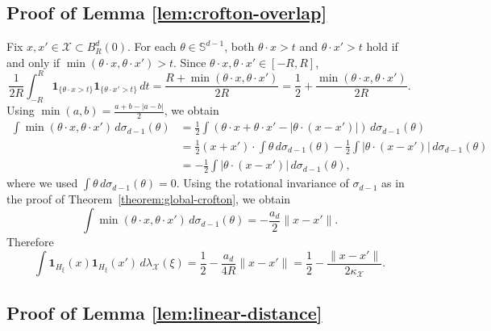 \documentclass[11pt]{amsart}
\theoremstyle{definition}
\theoremstyle{remark}
\newcommand{\1}{\mathbf{1}}
\newcommand{\Sd}{\mathbb{S}}
\numberwithin{equation}{section}
\begin{document}
\subsection{Proof of Lemma \ref{lem:crofton-overlap}}
\label{pf:crofton-overlap}
Fix $x,x'\in \mathcal{X} \subset B^d_R(0)$. For each $\theta \in \Sd^{d-1}$,
both $\theta\cdot x > t$ and $\theta\cdot x'> t$ hold if and only if
$\min(\theta\cdot x, \theta\cdot x') > t$. Since
$\theta\cdot x, \theta\cdot x' \in [-R,R]$,
\[
    \frac{1}{2R}\int_{-R}^R
    \mathbf 1_{\{\theta\cdot x>t\}}
    \mathbf 1_{\{\theta\cdot x'>t\}}
    \, dt
    = \frac{R+\min(\theta\cdot x,\theta\cdot x')}{2R}
    = \frac{1}{2} + \frac{\min(\theta\cdot x,\theta\cdot x')}{2R}.
\]
Using $\min(a,b)=\frac{a+b-|a-b|}{2}$, we obtain
\begin{align*}
\int
    \min(\theta\cdot x,\theta\cdot x')
    \, d\sigma_{d-1}(\theta)
&=
\frac12
\int
    (\theta\cdot x+\theta\cdot x'
    -|\theta\cdot(x-x')|)
    \, d\sigma_{d-1}(\theta) \\
&=
\frac12 (x+x')\cdot
\int
    \theta
    \, d\sigma_{d-1}(\theta)
-
\frac12
\int
    |\theta\cdot(x-x')|
    \, d\sigma_{d-1}(\theta) \\
&=
-\frac12
\int
    |\theta\cdot(x-x')|
    \, d\sigma_{d-1}(\theta),
\end{align*}
where we used $\int\theta \, d\sigma_{d-1}(\theta)=0$. Using the rotational
invariance of $\sigma_{d-1}$ as in the proof of
Theorem~\ref{theorem:global-crofton}, we obtain
\[
    \int
        \min(\theta\cdot x,\theta\cdot x')
    \,d\sigma_{d-1}(\theta)
    =
    -\frac{a_d}{2}\|x-x'\|.
\]
Therefore
\[
    \int
    \mathbf 1_{H_\xi}(x)\mathbf 1_{H_\xi}(x')
    \,d\lambda_{\mathcal{X}}(\xi)
    =
    \frac12-\frac{a_d}{4R}\|x-x'\|
    =
    \frac12-\frac{\|x-x'\|}{2\kappa_{\mathcal{X}}}.
\]

\subsection{Proof of Lemma \ref{lem:linear-distance}}
\label{pf:linear-distance}
\end{document}
